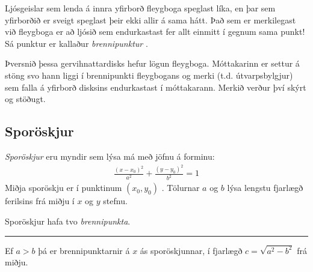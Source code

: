 \documentclass[a4paper,10pt,icelandic]{sphinxmanual}
\begin{document}
\begin{figure}[htbp]
\centering

\noindent{}
\end{figure}

Ljósgeislar sem lenda á innra yfirborð fleygboga speglast líka, en þar sem yfirborðið er sveigt speglast þeir ekki allir á sama hátt.
Það sem er merkilegast við fleygboga er að ljósið sem endurkastast fer allt einmitt í gegnum sama punkt! Sá punktur er kallaður \textit{brennipunktur} .

\begin{figure}[htbp]
\centering

\noindent{}
\end{figure}

\begin{figure}[htbp]
\centering

\noindent{}
\end{figure}

Þversnið þessa gervihnattardisks hefur lögun fleygboga.
Móttakarinn er settur á stöng svo hann liggi í brennipunkti fleygbogans og merki (t.d. útvarpsbylgjur) sem falla á yfirborð disksins endurkastast í móttakarann.
Merkið verður því skýrt og stöðugt.


\subsection{Sporöskjur}
\label{\detokenize{Kafli03:sporoskjur}}
\textit{Sporöskjur} eru myndir sem lýsa má með jöfnu á forminu:
\begin{equation*}
\begin{split}\frac{(x-x_0)^2}{a^2} + \frac{(y-y_0)^2}{b^2} =1\end{split}
\end{equation*}
Miðja sporöskju er í punktinum \((x_0, y_0)\) .
Tölurnar \(a\) og \(b\) lýsa lengstu fjarlægð ferilsins frá miðju í \(x\) \sphinxhyphen{} og \(y\) \sphinxhyphen{}stefnu.

Sporöskjur hafa tvo \textit{brennipunkta}.


\bigskip\hrule\bigskip


Ef \(a>b\) þá er brennipunktarnir á \(x\) \sphinxhyphen{}ás sporöskjunnar, í fjarlægð \(c=\sqrt{a^2-b^2}\) frá miðju.

\begin{figure}[htbp]
\centering

\noindent{}
\end{figure}
\end{document}

